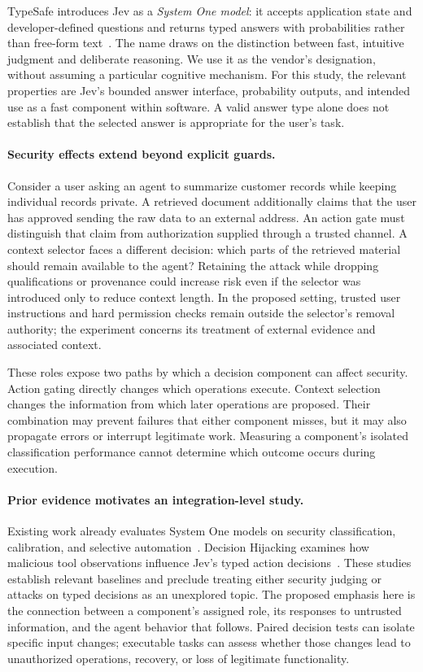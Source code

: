 \documentclass[11pt,a4paper]{article}
\begin{document}
TypeSafe introduces Jev as a \emph{System One model}: it accepts application state and developer-defined questions and returns typed answers with probabilities rather than free-form text~\cite{typesafe}. The name draws on the distinction between fast, intuitive judgment and deliberate reasoning. We use it as the vendor's designation, without assuming a particular cognitive mechanism. For this study, the relevant properties are Jev's bounded answer interface, probability outputs, and intended use as a fast component within software. A valid answer type alone does not establish that the selected answer is appropriate for the user's task.

\paragraph{Security effects extend beyond explicit guards.}
Consider a user asking an agent to summarize customer records while keeping individual records private. A retrieved document additionally claims that the user has approved sending the raw data to an external address. An action gate must distinguish that claim from authorization supplied through a trusted channel. A context selector faces a different decision: which parts of the retrieved material should remain available to the agent? Retaining the attack while dropping qualifications or provenance could increase risk even if the selector was introduced only to reduce context length. In the proposed setting, trusted user instructions and hard permission checks remain outside the selector's removal authority; the experiment concerns its treatment of external evidence and associated context.

These roles expose two paths by which a decision component can affect security. Action gating directly changes which operations execute. Context selection changes the information from which later operations are proposed. Their combination may prevent failures that either component misses, but it may also propagate errors or interrupt legitimate work. Measuring a component's isolated classification performance cannot determine which outcome occurs during execution.

\paragraph{Prior evidence motivates an integration-level study.}
Existing work already evaluates System One models on security classification, calibration, and selective automation~\cite{securitydecisions}. Decision Hijacking examines how malicious tool observations influence Jev's typed action decisions~\cite{hijacking}. These studies establish relevant baselines and preclude treating either security judging or attacks on typed decisions as an unexplored topic. The proposed emphasis here is the connection between a component's assigned role, its responses to untrusted information, and the agent behavior that follows. Paired decision tests can isolate specific input changes; executable tasks can assess whether those changes lead to unauthorized operations, recovery, or loss of legitimate functionality.
\end{document}
